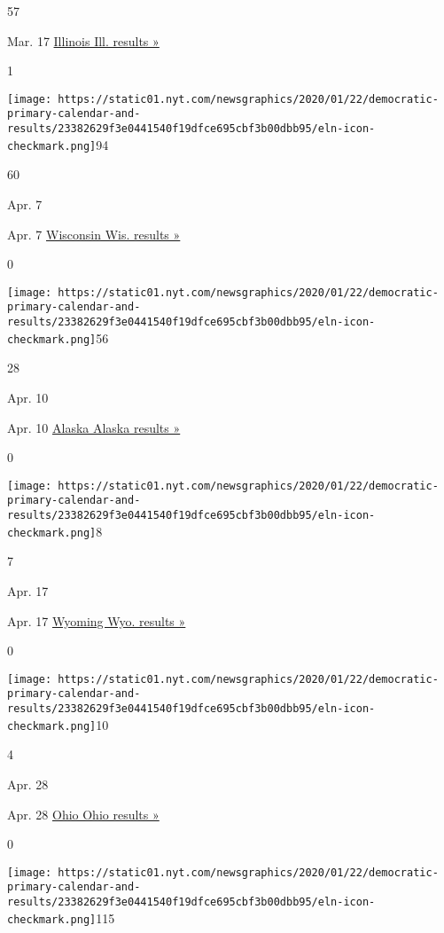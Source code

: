 57

Mar. 17
\href{https://www.nytimes.com/interactive/2020/03/17/us/elections/results-illinois-president-democrat-primary-election.html}{Illinois
Ill. results »}

1

\texttt{[image: https://static01.nyt.com/newsgraphics/2020/01/22/democratic-primary-calendar-and-results/23382629f3e0441540f19dfce695cbf3b00dbb95/eln-icon-checkmark.png]}94

60

Apr. 7

Apr. 7
\href{https://www.nytimes.com/interactive/2020/04/07/us/elections/results-wisconsin-president-democrat-primary-election.html}{Wisconsin
Wis. results »}

0

\texttt{[image: https://static01.nyt.com/newsgraphics/2020/01/22/democratic-primary-calendar-and-results/23382629f3e0441540f19dfce695cbf3b00dbb95/eln-icon-checkmark.png]}56

28

Apr. 10

Apr. 10
\href{https://www.nytimes.com/interactive/2020/04/11/us/elections/results-alaska-president-democrat-primary-election.html}{Alaska
Alaska results »}

0

\texttt{[image: https://static01.nyt.com/newsgraphics/2020/01/22/democratic-primary-calendar-and-results/23382629f3e0441540f19dfce695cbf3b00dbb95/eln-icon-checkmark.png]}8

7

Apr. 17

Apr. 17
\href{https://www.nytimes.com/interactive/2020/04/19/us/elections/results-wyoming-president-democrat-caucus-election.html}{Wyoming
Wyo. results »}

0

\texttt{[image: https://static01.nyt.com/newsgraphics/2020/01/22/democratic-primary-calendar-and-results/23382629f3e0441540f19dfce695cbf3b00dbb95/eln-icon-checkmark.png]}10

4

Apr. 28

Apr. 28
\href{https://www.nytimes.com/interactive/2020/04/28/us/elections/results-ohio-primary-elections.html}{Ohio
Ohio results »}

0

\texttt{[image: https://static01.nyt.com/newsgraphics/2020/01/22/democratic-primary-calendar-and-results/23382629f3e0441540f19dfce695cbf3b00dbb95/eln-icon-checkmark.png]}115

